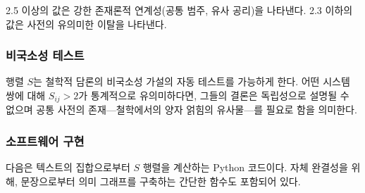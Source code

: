 \documentclass[11pt,a4paper]{article}
\begin{document}
	2.5 이상의 값은 강한 존재론적 연계성(공통 범주, 유사 공리)을 나타낸다. 2.3 이하의 값은 사전의 유의미한 이탈을 나타낸다.
	
	\subsubsection{비국소성 테스트}
	
	행렬 \(S\)는 철학적 담론의 비국소성 가설의 자동 테스트를 가능하게 한다. 어떤 시스템 쌍에 대해 \(S_{ij} > 2\)가 통계적으로 유의미하다면, 그들의 결론은 독립성으로 설명될 수 없으며 공통 사전의 존재—철학에서의 양자 얽힘의 유사물—를 필요로 함을 의미한다.
	
	\subsubsection{소프트웨어 구현}
	
	다음은 텍스트의 집합으로부터 \(S\) 행렬을 계산하는 Python 코드이다. 자체 완결성을 위해, 문장으로부터 의미 그래프를 구축하는 간단한 함수도 포함되어 있다.
	
\end{document}
